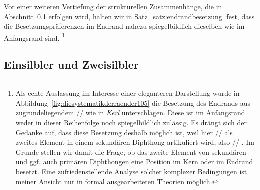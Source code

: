 \begin{exe}
  \ex \label{ex:diesystematikderraender128}
  \begin{xlist}
  \end{xlist}
\end{exe}

Vor einer weiteren Vertiefung der strukturellen Zusammenhänge, die in Abschnitt~\ref{sec:einsilblerundzweisilbler} erfolgen wird, halten wir in Satz~\ref{satz:endrandbesetzung} fest, dass die Besetzungspräferenzen im Endrand nahezu spiegelbildlich dieselben wie im Anfangsrand sind.%
\footnote{Als echte Auslassung im Interesse einer eleganteren Darstellung wurde in Abbildung~\ref{fig:diesystematikderraender105} die Besetzung des Endrands aus zugrundeliegendem // wie in \textit{Kerl} unterschlagen.
Diese ist im Anfangsrand weder in dieser Reihenfolge noch spiegelbildlich zulässig.
Es drängt sich der Gedanke auf, dass diese Besetzung deshalb möglich ist, weil hier // als zweites Element in einem sekundären Diphthong artikuliert wird, also // \phopro \textipa{[k\t{E@}l]}.
Im Grunde stellen wir damit die Frage, ob das zweite Element von sekundären und ggf. auch primären Diphthongen eine Position im Kern oder im Endrand besetzt.
Eine zufriedenstellende Analyse solcher komplexer Bedingungen ist meiner Ansicht nur in formal ausgearbeiteten Theorien möglich.}


\subsection{Einsilbler und Zweisilbler}
\label{sec:einsilblerundzweisilbler}

